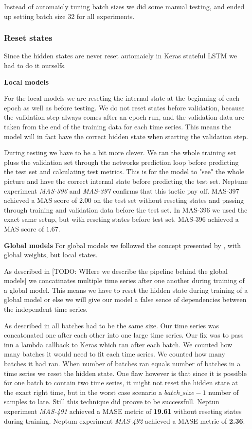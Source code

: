 Instead of automaicly tuning batch sizes we did some manual testing, and
ended up setting batch size 32 for all experiments.


\subsubsection{Reset states}
Since  the hidden states are never reset automaicly in Keras stateful LSTM
we had to do it ourselfs.

\textbf{Local models}

For the local models we are reseting the internal state at the beginning
of each epoch as well as before testing. We do not reset states before validation,
because the validation step always comes after an epoch run, and the
validation data are taken from the end of the training data for each time series.
This means the model will in fact have the correct hidden state when starting the validation step.

During testing we have to be a bit more clever. We ran the whole training set pluss
the validation set through the networks prediction loop before predicting the test
set and calculating test metrics.
This is for the model to "see" the whole picture and have the correct
internal state before predicting the test set.
Neptune experiment \textit{MAS-396} and \textit{MAS-397} confirms
that this tactic pay off. MAS-397 achieved a MAS score of $2.00$ on the test set
without reseting states and passing through training and validation data before
the test set. In MAS-396 we used the exact same setup, but with reseting states
before test set. MAS-396 achieved a MAS score of $1.67$.

\textbf{Global models}
For global models we followed the concept presented by \cite{Smyl2020},
with global weights, but local states.

As described in [TODO: WHere we describe the pipeline behind the global models]
we concatinates multiple time series after one another during training of a global model.
This means we have to reset the hidden state during training of a global model
or else we will give our model a false sence of dependencies between
the independent time series.

As described in  all
batches had to be the same size. Our time series was concatonated one after
each other into one large time series.
Our fix was to pass inn a lambda callback to Keras which ran after each batch.
We counted how many batches it would need to fit each time series.
We counted how many batches it had ran. When number of batches ran equals
number of batches in a time series we reset the hidden state.
One flaw however is that since it is possible for one batch to
contain two time series, it might not reset the hidden state at the exact
right time, but in the worst case scenario a $batch\_size - 1$ number of
samples to late. Still this technique did proove to be successfull.
Neptun experiment \textit{MAS-491} achieved a MASE metric of \textbf{19.61}
without reseting states during training.
Neptum experiment \textit{MAS-492} achieved a MASE metric of \textbf{2.36}.

